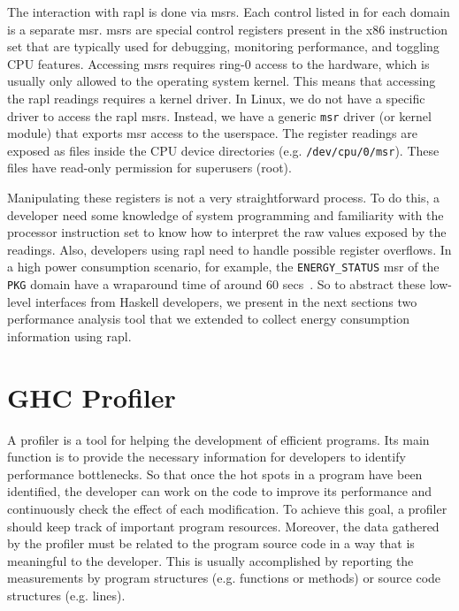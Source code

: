 The interaction with \acs{rapl} is done via \acp{msr}. Each control listed in  for each domain is a separate \ac{msr}. \acp{msr} are special control registers present in the x86 instruction set that are typically used for debugging, monitoring performance, and toggling CPU features. Accessing \acp{msr} requires ring-0 access to the hardware, which is usually only allowed to the operating system kernel. This means that accessing the \ac{rapl} readings requires a kernel driver. In Linux, we do not have a specific driver to access the \ac{rapl} \acp{msr}. Instead, we have a generic \texttt{msr} driver (or kernel module) that exports \ac{msr} access to the userspace. The register readings are exposed as files inside the CPU device directories (e.g. \texttt{/dev/cpu/0/msr}). These files have read-only permission for superusers (root).

Manipulating these registers is not a very straightforward process. To do this, a developer need some knowledge of system programming and familiarity with the processor instruction set to know how to interpret the raw values exposed by the readings. Also, developers using \ac{rapl} need to handle possible register overflows. In a high power consumption scenario, for example, the \texttt{ENERGY\_STATUS} \ac{msr} of the \texttt{PKG} domain have a wraparound time of around 60 secs~\citep[p. 2465]{intel:2016}. So to abstract these low-level interfaces from Haskell developers, we present in the next sections two performance analysis tool that we extended to collect energy consumption information using \ac{rapl}.


\section{GHC Profiler}\label{sec:profiler}
A profiler is a tool for helping the development of efficient programs. Its main function is to provide the necessary information for developers to identify performance bottlenecks. So that once the hot spots in a program have been identified, the developer can work on the code to improve its performance and continuously check the effect of each modification. To achieve this goal, a profiler should keep track of important program resources. Moreover, the data gathered by the profiler must be related to the program source code in a way that is meaningful to the developer. This is usually accomplished by reporting the measurements by program structures (e.g. functions or methods) or source code structures (e.g. lines).

